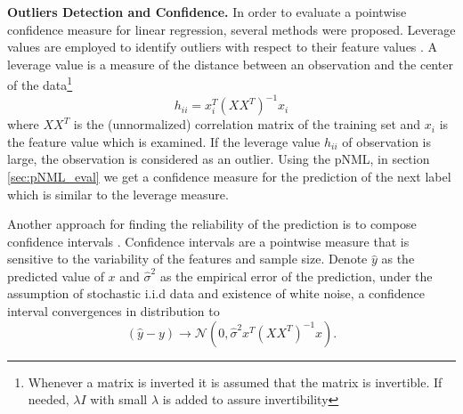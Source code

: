 \documentclass[conference,letterpaper]{IEEEtran}
\begin{document}
\textbf{Outliers Detection and Confidence.}
In order to evaluate a pointwise confidence measure for linear regression, several methods were proposed. 
Leverage values are employed to identify outliers with respect to their feature values \cite{cardinali2013observation}. 
A leverage value is a measure of the distance between an observation and the center of the data\footnote{Whenever a matrix is inverted it is assumed that the matrix is invertible. If needed, $\lambda I$ with small $\lambda$ is added to assure invertibility}
\begin{equation}
h_{ii}=x_i^T(XX^T)^{-1}x_i
\end{equation}
where $XX^T$ is the (unnormalized) correlation matrix of the training set and $x_i$ is the feature value which is examined.
If the leverage value $h_{ii}$ of observation is large, the observation is considered as an outlier.
Using the pNML, in section \ref{sec:pNML_eval} we get a confidence measure for the prediction of the next label which is similar to the leverage measure.

Another approach for finding the reliability of the prediction is to compose confidence intervals \cite{trevor2009elements}.
Confidence intervals are a pointwise measure that is sensitive to the variability of the features and sample size.
Denote $\hat{y}$ as the predicted value of $x$ and  $\hat{\sigma}^2$ as the empirical error of the prediction, under the assumption of stochastic i.i.d data and existence of white noise, a confidence interval convergences in distribution to
\begin{equation}
(\hat{y} - y) \xrightarrow{} \mathcal{N}(0, \hat{\sigma}^2 x^T(XX^T)^{-1}x).
\end{equation}


\end{document}
